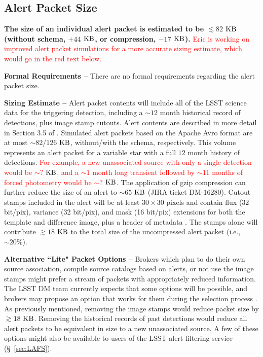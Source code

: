 \documentclass[DM,authoryear,toc]{lsstdoc}
\begin{document}
\subsection{Alert Packet Size}\label{ssec:packet_size}

{\bf The size of an individual alert packet is estimated to be $\lesssim82$ $\rm KB$ (without schema, $+44$ $\rm KB$, or compression, $-17$ $\rm KB$).} \textcolor{red}{Eric is working on improved alert packet simulations for a more accurate sizing estimate, which would go in the red text below.}

{\bf Formal Requirements --} There are no formal requirements regarding the alert packet size.

{\bf Sizing Estimate --} Alert packet contents will include all of the LSST science data for the triggering detection, including a $\sim12$ month historical record of detections, plus image stamp cutouts. Alert contents are described in more detail in Section 3.5 of . Simulated alert packets based on the Apache Avro format are at most $\sim82$/$126$ $\rm KB$, without/with the schema, respectively. This volume represents an alert packet for a variable star with a full $12$ month history of detections. \textcolor{red}{For example, a new unassociated source with only a single detection would be $\sim?$ $\rm KB$, and a $\sim1$ month long transient followed by $\sim11$ months of forced photometry would be $\sim?$ $\rm KB$.} The application of gzip compression can further reduce the size of an alert to $\sim65$ $\rm KB$ (JIRA ticket DM-16280). Cutout stamps included in the alert will be at least $30\times30$ pixels and contain flux (32 bit/pix), variance (32 bit/pix), and mask (16 bit/pix) extensions for both the template and difference image, plus a header of metadata . The stamps alone will contribute $\gtrsim18$ $\rm KB$ to the total size of the uncompressed alert packet (i.e., $\sim20\%$).

{\bf Alternative ``Lite" Packet Options --} Brokers which plan to do their own source association, compile source catalogs based on alerts, or not use the image stamps might prefer a stream of packets with appropriately reduced information. The LSST DM team currently expects that some options will be possible, and brokers may propose an option that works for them during the selection process . As previously mentioned, removing the image stamps would reduce packet size by $\gtrsim18$ $\rm KB$. Removing the historical records of past detections would reduce all alert packets to be equivalent in size to a new unassociated source. A few of these options might also be available to users of the LSST alert filtering service (\S~\ref{sec:LAFS}). 
\end{document}
